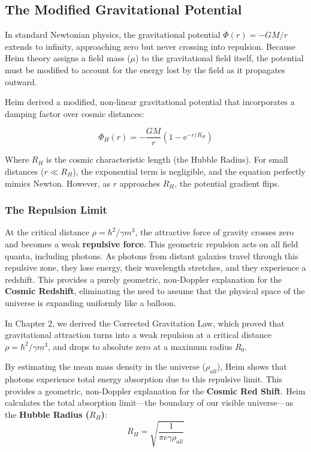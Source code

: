 \documentclass[11pt,a4paper,oneside]{article}
\newcommand{\eu}{\mathrm{e}}              %
\begin{document}
\subsection{The Modified Gravitational Potential}
In standard Newtonian physics, the gravitational potential $\Phi(r) = -G M / r$ extends to infinity, approaching zero but never crossing into repulsion. Because Heim theory assigns a field mass ($\mu$) to the gravitational field itself, the potential must be modified to account for the energy lost by the field as it propagates outward.

Heim derived a modified, non-linear gravitational potential that incorporates a damping factor over cosmic distances:

\begin{equation}
    \Phi_H(r) = -\frac{G M}{r} \left( 1 - \eu^{-r / R_H} \right)
\end{equation}

Where $R_H$ is the cosmic characteristic length (the Hubble Radius). For small distances ($r \ll R_H$), the exponential term is negligible, and the equation perfectly mimics Newton. However, as $r$ approaches $R_H$, the potential gradient flips. 

\subsubsection{The Repulsion Limit}
At the critical distance $\rho = \hbar^2 / \gamma m^3$, the attractive force of gravity crosses zero and becomes a weak \textbf{repulsive force}. This geometric repulsion acts on all field quanta, including photons. As photons from distant galaxies travel through this repulsive zone, they lose energy, their wavelength stretches, and they experience a redshift. This provides a purely geometric, non-Doppler explanation for the \textbf{Cosmic Redshift}, eliminating the need to assume that the physical space of the universe is expanding uniformly like a balloon.

In Chapter 2, we derived the Corrected Gravitation Law, which proved that gravitational attraction turns into a weak repulsion at a critical distance $\rho = \hbar^2 / \gamma m^3$, and drops to absolute zero at a maximum radius $R_0$. 

By estimating the mean mass density in the universe ($\rho_{all}$), Heim shows that photons experience total energy absorption due to this repulsive limit. This provides a geometric, non-Doppler explanation for the \textbf{Cosmic Red Shift}. Heim calculates the total absorption limit—the boundary of our visible universe—as the \textbf{Hubble Radius ($R_H$)}:
\begin{equation}
    R_H = \sqrt{\frac{1}{\pi e \gamma \rho_{all}}}
\end{equation}
\end{document}
